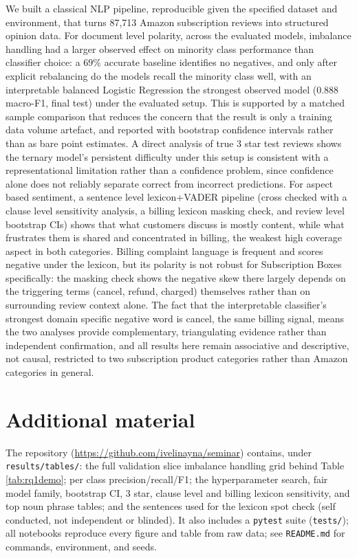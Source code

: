 \documentclass[11pt,a4paper,DIV=12]{scrartcl}
\begin{document}
We built a classical NLP pipeline, reproducible given the specified dataset and
environment, that turns 87{,}713 Amazon subscription reviews into structured
opinion data. For document level polarity, across the evaluated models,
imbalance handling had a larger observed effect on minority class performance
than classifier choice: a $69\%$ accurate baseline identifies no negatives, and
only after explicit rebalancing do the models recall the minority class well,
with an interpretable balanced Logistic Regression the strongest
observed model ($0.888$ macro-F1, final test) under the evaluated setup. This is
supported by a matched sample comparison that reduces the concern that the
result is only a training data volume artefact, and reported with bootstrap
confidence intervals rather than as bare point estimates. A direct analysis of true 3 star test reviews shows
the ternary model's persistent difficulty under this setup is consistent with
a representational limitation rather than a confidence problem, since
confidence alone does not reliably separate correct from incorrect
predictions. For aspect based
sentiment, a sentence level lexicon+VADER pipeline (cross checked with a
clause level sensitivity analysis, a billing lexicon masking check, and
review level bootstrap CIs) shows that what customers discuss is mostly
content, while what frustrates them is shared and concentrated in
billing, the weakest high coverage aspect in both categories.
Billing complaint language is frequent and scores negative under the lexicon,
but its polarity is not robust for Subscription Boxes specifically: the
masking check shows the negative skew there largely depends on the
triggering terms (cancel, refund, charged) themselves
rather than on surrounding review context alone. The fact that
the interpretable classifier's strongest domain specific negative word is
cancel, the same billing signal, means the two analyses provide
complementary, triangulating evidence rather than independent confirmation,
and all results here remain associative and descriptive, not causal,
restricted to two subscription product categories rather than Amazon
categories in general.




\appendix
\section{Additional material}
\label{app:val}
The repository (\url{https://github.com/ivelinayna/seminar}) contains, under
\texttt{results/tables/}: the full validation slice imbalance handling grid
behind Table \ref{tab:rq1demo}; per class precision/recall/F1; the
hyperparameter search, fair model family, bootstrap CI, 3 star,
clause level and billing lexicon sensitivity, and top noun phrase tables; and the
sentences used for the lexicon spot check (self conducted, not independent or
blinded). It also includes a \texttt{pytest} suite (\texttt{tests/}); all
notebooks reproduce every figure and table from raw data; see
\texttt{README.md} for commands, environment, and seeds.
\end{document}
